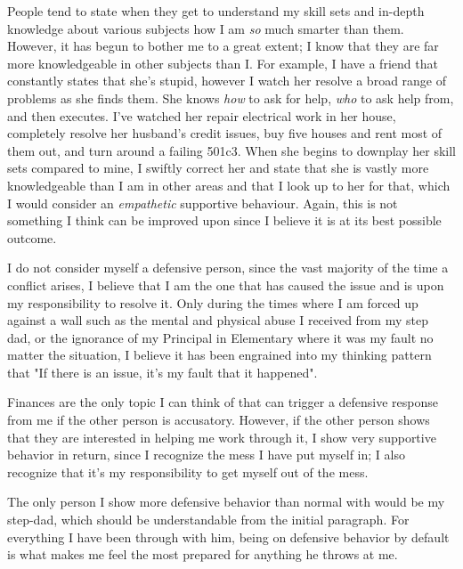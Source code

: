 \documentclass[12pt]{article}
\begin{document}
People tend to state when they get to understand my skill sets and in-depth knowledge about various subjects how I am \emph{so} much smarter than them. However, it has begun to bother me to a great extent; I know that they are far more knowledgeable in other subjects than I. For example, I have a friend that constantly states that she's stupid, however I watch her resolve a broad range of problems as she finds them. She knows \emph{how} to ask for help, \emph{who} to ask help from, and then executes. I've watched her repair electrical work in her house, completely resolve her husband's credit issues, buy five houses and rent most of them out, and turn around a failing 501c3. When she begins to downplay her skill sets compared to mine, I swiftly correct her and state that she is vastly more knowledgeable than I am in other areas and that I look up to her for that, which I would consider an \emph{empathetic} supportive behaviour. Again, this is not something I think can be improved upon since I believe it is at its best possible outcome.
\par
I do not consider myself a defensive person, since the vast majority of the time a conflict arises, I believe that I am the one that has caused the issue and is upon my responsibility to resolve it. Only during the times where I am forced up against a wall such as the mental and physical abuse I received from my step dad, or the ignorance of my Principal in Elementary where it was my fault no matter the situation, I believe it has been engrained into my thinking pattern that "If there is an issue, it's my fault that it happened".
\par
Finances are the only topic I can think of that can trigger a defensive response from me if the other person is accusatory. However, if the other person shows that they are interested in helping me work through it, I show very supportive behavior in return, since I recognize the mess I have put myself in; I also recognize that it's my responsibility to get myself out of the mess.
\par
The only person I show more defensive behavior than normal with would be my step-dad, which should be understandable from the initial paragraph. For everything I have been through with him, being on defensive behavior by default is what makes me feel the most prepared for anything he throws at me.
\end{document}
